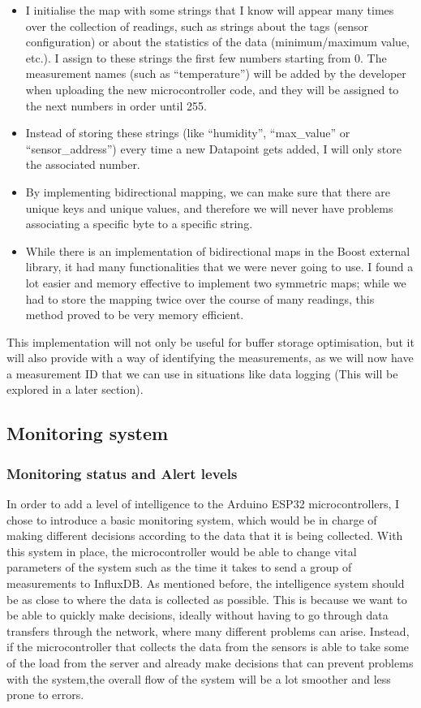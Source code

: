 \documentclass[12pt]{article}
\begin{document}
\begin{itemize}
    \item I initialise the map with some strings that I know will appear many times over the collection of readings, such as strings about the tags (sensor configuration) or about the statistics of the data (minimum/maximum value, etc.). I assign to these strings the first few numbers starting from 0. The measurement names (such as ``temperature'') will be added by the developer when uploading the new microcontroller code, and they will be assigned to the next numbers in order until 255.
    \item Instead of storing these strings (like ``humidity'', ``max\_value'' or ``sensor\_address'') every time a new Datapoint gets added, I will only store the associated number. 
    \item By implementing bidirectional mapping, we can make sure that there are unique keys and unique values, and therefore we will never have problems associating a specific byte to a specific string.
    \item While there is an implementation of bidirectional maps in the Boost external library, it had many functionalities that we were never going to use. I found a lot easier and memory effective to implement two symmetric maps; while we had to store the mapping twice over the course of many readings, this method proved to be very memory efficient. 
\end{itemize}

This implementation will not only be useful for buffer storage optimisation, but it will also provide with a way of identifying the measurements, as we will now have a measurement ID that we can use in situations like data logging (This will be explored in a later section).

\subsection{Monitoring system}

\subsubsection{Monitoring status and Alert levels}

In order to add a level of intelligence to the Arduino ESP32 microcontrollers, I chose to introduce a basic monitoring system, which would be in charge of making different decisions according to the data that it is being collected. With this system in place, the microcontroller would be able to change vital parameters of the system such as the time it takes to send a group of measurements to InfluxDB. As mentioned before, the intelligence system should be as close to where the data is collected as possible. This is because we want to be able to quickly make decisions, ideally without having to go through data transfers through the network, where many different problems can arise. Instead, if the microcontroller that collects the data from the sensors is able to take some of the load from the server and already make decisions that can prevent problems with the system,the overall flow of the system will be a lot smoother and less prone to errors.\par
\end{document}
